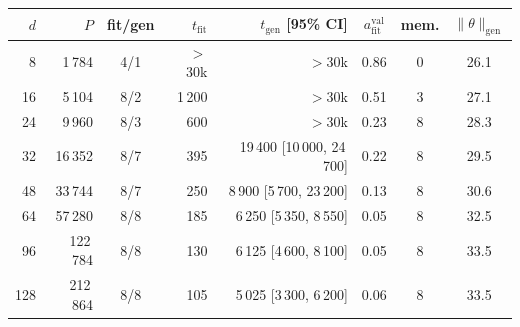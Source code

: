 \begin{tabular}{rrcrrccc}
\toprule
$d$ & $P$ & fit/gen & $t_{\mathrm{fit}}$ & $t_{\mathrm{gen}}$ [95\% CI] & $a^{\mathrm{val}}_{\mathrm{fit}}$ & mem. & $\|\theta\|_{\mathrm{gen}}$ \\
\midrule
8 & 1\,784 & 4/1 & $>$30k & $>$30k & 0.86 & 0 & 26.1 \\
16 & 5\,104 & 8/2 & 1\,200 & $>$30k & 0.51 & 3 & 27.1 \\
24 & 9\,960 & 8/3 & 600 & $>$30k & 0.23 & 8 & 28.3 \\
32 & 16\,352 & 8/7 & 395 & 19\,400 [10\,000, 24\,700] & 0.22 & 8 & 29.5 \\
48 & 33\,744 & 8/7 & 250 & 8\,900 [5\,700, 23\,200] & 0.13 & 8 & 30.6 \\
64 & 57\,280 & 8/8 & 185 & 6\,250 [5\,350, 8\,550] & 0.05 & 8 & 32.5 \\
96 & 122\,784 & 8/8 & 130 & 6\,125 [4\,600, 8\,100] & 0.05 & 8 & 33.5 \\
128 & 212\,864 & 8/8 & 105 & 5\,025 [3\,300, 6\,200] & 0.06 & 8 & 33.5 \\
\bottomrule
\end{tabular}
